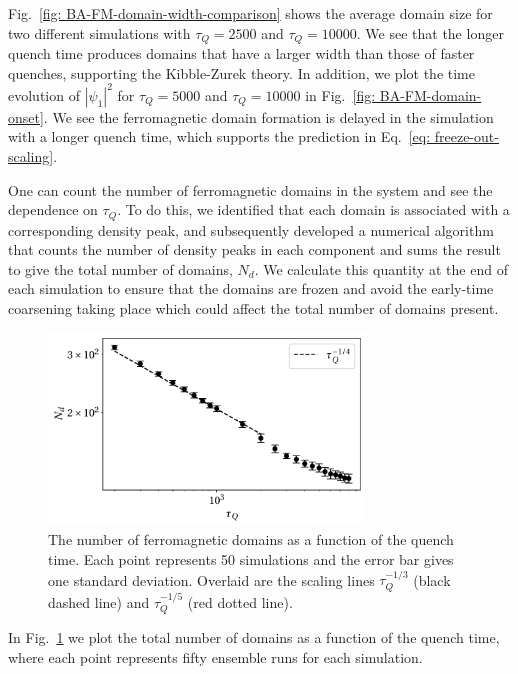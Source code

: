 Fig.~\ref{fig: BA-FM-domain-width-comparison} shows the average domain size
for two different simulations with \(\tau_Q=2500\) and \(\tau_Q=10000\).
We see that the longer quench time produces domains that have a
larger width than those of faster quenches, supporting the Kibble-Zurek theory.
In addition, we plot the time evolution of \(|\psi_1|^2\) for \(\tau_Q=5000\) and
\(\tau_Q=10000\) in Fig.~\ref{fig: BA-FM-domain-onset}.
We see the ferromagnetic domain formation is delayed in the simulation
with a longer quench time, which supports the prediction in
Eq.~\eqref{eq: freeze-out-scaling}.

One can count the number of ferromagnetic domains in the system and see the
dependence on \( \tau_Q \).
To do this, we identified that each domain is associated with a corresponding
density peak, and subsequently developed a numerical algorithm that counts the
number of density peaks in each component and sums the result to give the total
number of domains, \(N_d\).
We calculate this quantity at the end of each simulation to ensure that the
domains are frozen and avoid the early-time coarsening taking place which could
affect the total number of domains present.
\begin{figure}
    \centering
    \includegraphics[width=0.75\textwidth]{gfx/ch-spin1/FM_domains_scaling.pdf}
    \caption[Total ferromagnetic domains in the system versus the quench rate
        \(\tau_Q\)]
    {The number of ferromagnetic domains as a function of the
        quench time. Each point represents 50 simulations and the
        error bar gives one standard deviation. Overlaid are the scaling lines
        \(\tau_Q^{-1/3}\) (black dashed line) and \(\tau_Q^{-1/5}\)
        (red dotted line).\label{fig: FM-domains-scaling}}
\end{figure}
In Fig.~\ref{fig: FM-domains-scaling} we plot the total number of domains
as a function of the quench time, where each point represents fifty ensemble
runs for each simulation.
